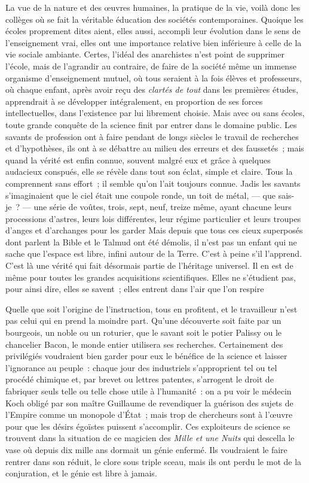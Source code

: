 \documentclass[french,twoside]{book} %
\begin{document}
La vue de la nature et des œuvres humaines, la pratique de la vie, voilà donc les collèges où se fait la véritable éducation des sociétés contemporaines. Quoique les écoles proprement dites aient, elles aussi, accompli leur évolution  dans le sens de l’enseignement vrai, elles ont une importance relative bien inférieure à celle de la vie sociale ambiante. Certes, l’idéal des anarchistes n’est point de supprimer l’école, mais de l’agrandir au contraire, de faire de la société même un immense organisme d’enseignement mutuel, où tous seraient à la fois élèves et professeurs, où chaque enfant, après avoir reçu des \emph{clartés de tout} dans les premières études, apprendrait à se développer intégralement, en proportion de ses forces intellectuelles, dans l’existence par lui librement choisie. Mais avec ou sans écoles, toute grande conquête de la science finit par entrer dans le domaine public. Les savants de profession ont à faire pendant de longs siècles le travail de recherches et d’hypothèses, ils ont à  se débattre au milieu des erreurs et des faussetés ; mais quand la vérité est enfin connue, souvent malgré eux et grâce à quelques audacieux conspués, elle se révèle dans tout son éclat, simple et claire. Tous la comprennent sans effort ; il semble qu’on l’ait toujours connue. Jadis les savants s’imaginaient que le ciel était une coupole ronde, un toit de métal, — que sais-je ? — une série de voûtes, trois, sept, neuf, treize même, ayant chacune leurs processions d’astres, leurs lois différentes, leur régime particulier et leurs troupes d’anges et d’archanges pour les garder Mais depuis que tous ces cieux superposés dont parlent la Bible et le Talmud ont été démolis, il n’est pas un enfant qui ne sache que l’espace est libre, infini autour de la Terre. C’est à peine  s’il l’apprend. C’est là une vérité qui fait désormais partie de l’héritage universel. Il en est de même pour toutes les grandes acquisitions scientifiques. Elles ne s’étudient pas, pour ainsi dire, elles se savent ; elles entrent dans l’air que l’on respire\par
Quelle que soit l’origine de l’instruction, tous en profitent, et le travailleur n’est pas celui qui en prend la moindre part. Qu’une découverte soit faite par un bourgeois, un noble ou un roturier, que le savant soit le potier Palissy ou le chancelier Bacon, le monde entier utilisera ses recherches. Certainement des privilégiés voudraient bien garder pour eux le bénéfice de la science et laisser l’ignorance au peuple : chaque jour des industriels s’approprient tel ou tel procédé chimique et, par brevet ou  lettres patentes, s’arrogent le droit de fabriquer seuls telle ou telle chose utile à l’humanité : on a pu voir le médecin Koch obligé par son maître Guillaume de revendiquer la guérison des sujets de l’Empire comme un monopole d’État ; mais trop de chercheurs sont à l’œuvre pour que les désirs égoïstes puissent s’accomplir. Ces exploiteurs de science se trouvent dans la situation de ce magicien des \emph{Mille et une Nuits} qui descella le vase où depuis dix mille ans dormait un génie enfermé. Ils voudraient le faire rentrer dans son réduit, le clore sous triple sceau, mais ils ont perdu le mot de la conjuration, et le génie est libre à jamais.\par
\end{document}
